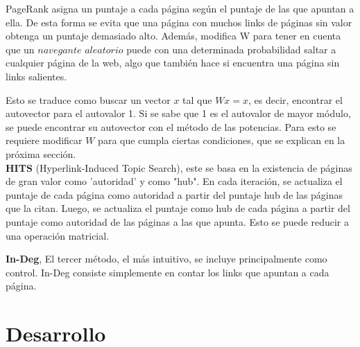 \documentclass[a4paper]{article}
\begin{document}
PageRank asigna un puntaje a cada página según el puntaje de las que apuntan a ella. De esta forma se evita que una página con muchos links de páginas sin valor obtenga un puntaje demasiado alto. Además, modifica W para tener en cuenta que un $navegante$ $aleatorio$ puede con una determinada probabilidad saltar a cualquier página de la web, algo que también hace si encuentra una página sin links salientes.

Esto se traduce como buscar un vector $x$ tal que $Wx=x$, es decir, encontrar el autovector para el autovalor 1. Si se sabe que 1 es el autovalor de mayor módulo, se puede encontrar su autovector con el método de las potencias. Para esto se requiere modificar $W$ para que cumpla ciertas condiciones, que se explican en la próxima sección.\\

\textbf{HITS} (Hyperlink-Induced Topic Search), este se basa en la existencia de páginas de gran valor como 'autoridad' y como "hub". En cada iteración, se actualiza el puntaje de cada página como autoridad a partir del puntaje hub de las páginas que la citan. Luego, se actualiza el puntaje como hub de cada página a partir del puntaje como autoridad de las páginas a las que apunta. Esto se puede reducir a una operación matricial.

\textbf{In-Deg}, El tercer método, el más intuitivo, se incluye principalmente como control. In-Deg consiste simplemente en contar los links que apuntan a cada página.\\

\newpage

\section{Desarrollo}
\label{sec:desarrollo}

\end{document}
